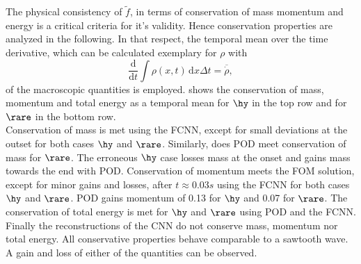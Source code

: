 The physical consistency of \(\tilde{f}\), in terms of conservation of mass momentum and energy is a critical criteria for it's validity. Hence conservation properties are analyzed in the following. In that respect, the temporal mean over the time derivative, which can be calculated exemplary for \(\rho\) with
\begin{equation}
	\frac{\mathrm{d}}{\mathrm{d}t}\int \rho(x,t)\, \mathrm{d}x\Delta t  =\overline{\dot{\rho}}\mathrm{,}
\end{equation}
of the macroscopic quantities is employed.  shows the conservation of mass, momentum and total energy as a temporal mean for \(\hy\) in the top row and for \(\rare\) in the bottom row.\\
Conservation of mass is met using the FCNN, except for small deviations at the outset for both cases \(\hy\) and \(\rare\). Similarly, does POD meet conservation of mass for \(\rare\). The erroneous \(\hy\) case losses mass at the onset and gains mass towards the end with POD. Conservation of momentum meets the FOM solution, except for minor gains and losses, after \(t\approx 0.03s\) using the FCNN for both cases \(\hy\) and \(\rare\). POD gains momentum of 0.13 for \(\hy\) and 0.07 for \(\rare\). The conservation of total energy is met for \(\hy\) and \(\rare\) using POD and the FCNN. Finally the reconstructions of the CNN do not conserve mass, momentum nor total energy. All conservative properties behave comparable to a sawtooth wave. A gain and loss of either of the quantities can be observed.\\

